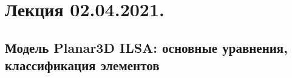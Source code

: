 \documentclass[main.tex]{subfiles}
\begin{document}

\section{Лекция 02.04.2021.}

\subsection{Модель Planar3D ILSA: основные уравнения, классификация элементов}
\end{document}
